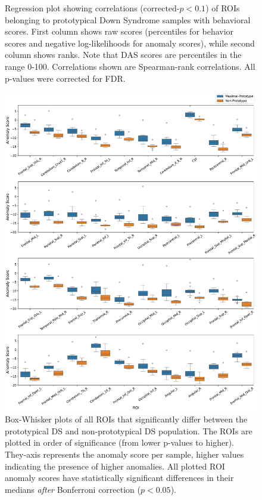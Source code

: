 \begin{figure}[tbhp!]
\caption{Regression plot showing correlations ($\text{corrected-}p < 0.1$) of ROIs belonging to prototypical Down Syndrome samples with behavioral scores.
First column shows raw scores (percentiles for behavior scores and negative log-likelihoods for anomaly scores), while second column shows ranks. Note that DAS scores are percentiles in the range 0-100. Correlations shown are Spearman-rank correlations. All p-values were corrected for FDR.}
\label{fig:roi-scatter}
\end{figure}

\begin{figure}[ht]
\centering
\includegraphics[width=\textwidth]{figures/roi_full_boxplot.pdf}
\caption{Box-Whisker plots of all ROIs that significantly differ between the prototypical DS and non-prototypical DS population. The ROIs are plotted in order of significance (from lower p-values to higher).  They-axis represents the anomaly score per sample, higher values indicating the presence of higher anomalies. All plotted ROI anomaly scores have statistically significant differences in their medians \textit{after} Bonferroni correction ($p < 0.05$). }
\label{fig:roi-box-full-ds}
\end{figure}




